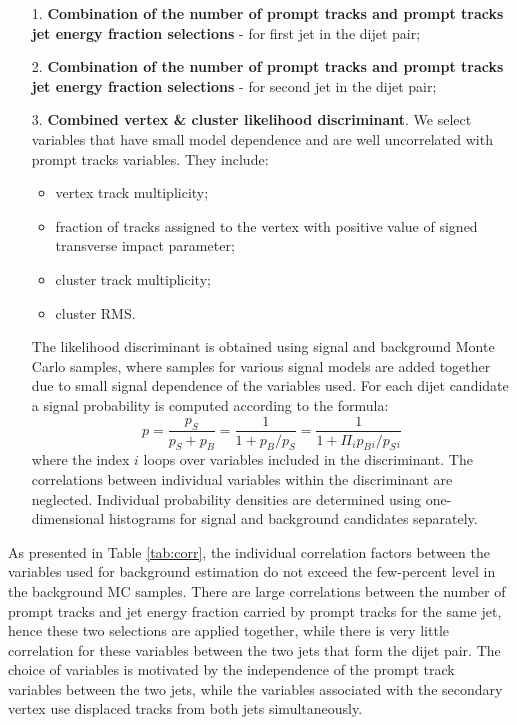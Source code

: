 \begin{itemize}     
\item[1.] {\bf Combination of the number of prompt tracks and prompt tracks jet energy fraction selections} - for first jet in the dijet pair;
\item[2.] {\bf Combination of the number of prompt tracks and prompt tracks jet energy fraction selections} - for second jet in the dijet pair;
\item[3.] {\bf Combined vertex \& cluster likelihood discriminant}. 
We select variables that have small model dependence and are 
well uncorrelated with prompt tracks variables. They include:
\begin{itemize}
 \item vertex track multiplicity;
 \item fraction of tracks assigned to the vertex with positive value of signed transverse impact parameter;
 \item cluster track multiplicity;
 \item cluster RMS.
\end{itemize}  
The likelihood discriminant is obtained using signal and background Monte Carlo samples, where samples for
various signal models are added together due to small signal dependence of the variables used.
For each dijet candidate a signal probability is computed according to the formula:
\begin{equation}
p=\frac{p_S}{p_S+p_B}=\frac{1}{1+p_B/p_S}=\frac{1}{1+\Pi_i p_B{}_i/p_S{}_i}
\label{eqn:likelihood}
\end{equation}
where the index $i$ loops over variables included in the discriminant. The correlations between individual variables 
within the discriminant are
neglected. Individual probability densities are determined 
using one-dimensional histograms for signal and background candidates separately.
\end{itemize}

As presented in Table \ref{tab:corr}, the individual correlation factors between the variables used for background
estimation do not exceed the few-percent level in the background MC samples.
There are large correlations between the number of prompt tracks and jet energy fraction carried by prompt tracks 
for the same jet, hence these two selections are applied together, while there is very little correlation for these
variables between the two jets that form the dijet pair. The choice of variables is
motivated by the independence of the prompt track variables between the two jets,
 while the variables associated with the secondary vertex use displaced tracks
from both jets simultaneously.

